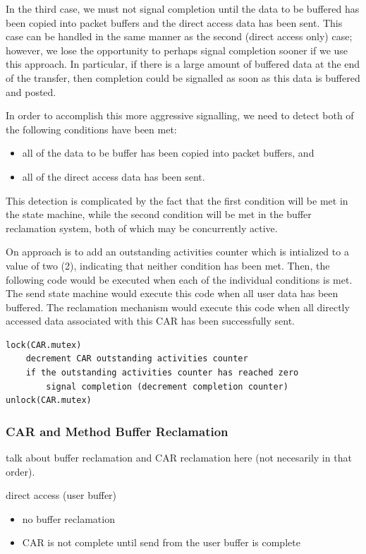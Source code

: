 \documentclass[11pt,letterpaper]{article}
\begin{document}
In the third case, we must not signal completion until the data to be buffered
has been copied into packet buffers and the direct access data has been sent.
This case can be handled in the same manner as the second (direct access only)
case; however, we lose the opportunity to perhaps signal completion sooner if
we use this approach.  In particular, if there is a large amount of buffered
data at the end of the transfer, then completion could be signalled as soon as
this data is buffered and posted.

In order to accomplish this more aggressive signalling, we need to detect both
of the following conditions have been met:
\begin{itemize}
\item all of the data to be buffer has been copied into packet buffers, and
\item all of the direct access data has been sent.
\end{itemize}
This detection is complicated by the fact that the first condition will be met
in the state machine, while the second condition will be met in the buffer
reclamation system, both of which may be concurrently active.

On approach is to add an outstanding activities counter which is intialized to
a value of two (2), indicating that neither condition has been met.  Then, the
following code would be executed when each of the individual conditions is met.
The send state machine would execute this code when all user data has been
buffered.  The reclamation mechanism would execute this code when all directly
accessed data associated with this CAR has been successfully sent.
\begin{verbatim}
lock(CAR.mutex)
    decrement CAR outstanding activities counter
    if the outstanding activities counter has reached zero
        signal completion (decrement completion counter)
unlock(CAR.mutex)
\end{verbatim}

%
%
\subsubsection{CAR and Method Buffer Reclamation}

talk about buffer reclamation and CAR reclamation here (not necesarily in that
order).

direct access (user buffer)
\begin{itemize}
\item no buffer reclamation
\item CAR is not complete until send from the user buffer is complete
\end{itemize}
\end{document}
